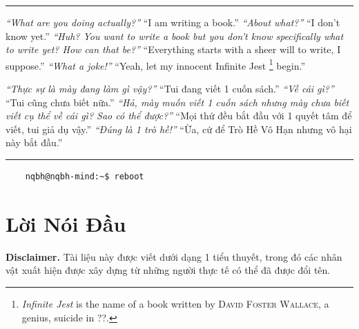 \documentclass[11pt,oneside]{book}
\begin{document}
\hrule
\begin{multicols}{2}
	\textit{``What are you doing actually?''} ``I am writing a book.'' \textit{``About what?''} ``I don't know yet.'' \textit{``Huh? You want to write a book but you don't know specifically what to write yet? How can that be?''} ``Everything starts with a sheer will to write, I suppose.'' \textit{``What a joke!''} ``Yeah, let my innocent Infinite Jest \footnote{\textit{Infinite Jest} is the name of a book written by \textsc{David Foster Wallace}, a genius, suicide in ??.} begin.''
	\columnbreak
	
	\textit{``Thực sự là mày đang làm gì vậy?''} ``Tui đang viết 1 cuốn sách.'' \textit{``Về cái gì?''} ``Tui cũng chưa biết nữa.'' \textit{``Hả, mày muốn viết 1 cuốn sách nhưng mày chưa biết viết cụ thể về cái gì? Sao có thể được?''} ``Mọi thứ đều bắt đầu với 1 quyết tâm để viết, tui giả dụ vậy.'' \textit{``Đúng là 1 trò hề!''} ``Ừa, cứ để Trò Hề Vô Hạn nhưng vô hại này bắt đầu.''	
\end{multicols}
\hrule
\noindent
\begin{verbatim}
	nqbh@nqbh-mind:~$ reboot
\end{verbatim}

\chapter{Lời Nói Đầu}

\textbf{Disclaimer.} Tài liệu này được viết dưới dạng 1 tiểu thuyết, trong đó các nhân vật xuất hiện được xây dựng từ những người thực tế có thể đã được đổi tên.


\printbibliography[heading=bibintoc]
\end{document}

